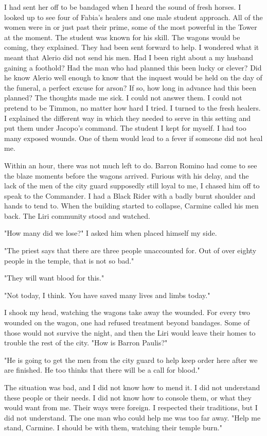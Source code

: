 \documentclass{article}
\begin{document}
I had sent her off to be bandaged when I heard the sound of fresh horses. I looked up to see four of Fabia's healers and one male student approach. All of the women were in or just past their prime, some of the most powerful in the Tower at the moment. The student was known for his skill. The wagons would be coming, they explained. They had been sent forward to help. I wondered what it meant that Alerio did not send his men. Had I been right about a my husband gaining a foothold? Had the man who had planned this been lucky or clever? Did he know Alerio well enough to know that the inquest would be held on the day of the funeral, a perfect excuse for arson? If so, how long in advance had this been planned? The thoughts made me sick. I could not answer them. I could not pretend to be Timmon, no matter how hard I tried. I turned to the fresh healers. I explained the different way in which they needed to serve in this setting and put them under Jacopo's command. The student I kept for myself. I had too many exposed wounds. One of them would lead to a fever if someone did not heal me.

Within an hour, there was not much left to do. Barron Romino had come to see the blaze moments before the wagons arrived. Furious with his delay, and the lack of the men of the city guard supposedly still loyal to me, I chased him off to speak to the Commander. I had a Black Rider with a badly burnt shoulder and hands to tend to. When the building started to collapse, Carmine called his men back. The Liri community stood and watched.

"How many did we lose?" I asked him when placed himself my side. 

"The priest says that there are three people unaccounted for. Out of over eighty people in the temple, that is not so bad."

"They will want blood for this."

"Not today, I think. You have saved many lives and limbs today."

I shook my head, watching the wagons take away the wounded. For every two wounded on the wagon, one had refused treatment beyond bandages. Some of those would not survive the night, and then the Liri would leave their homes to trouble the rest of the city. "How is Barron Paulis?"

"He is going to get the men from the city guard to help keep order here after we are finished. He too thinks that there will be a call for blood."

The situation was bad, and I did not know how to mend it. I did not understand these people or their needs. I did not know how to console them, or what they would want from me. Their ways were foreign. I respected their traditions, but I did not understand. The one man who could help me was too far away. "Help me stand, Carmine. I should be with them, watching their temple burn."
\end{document}
